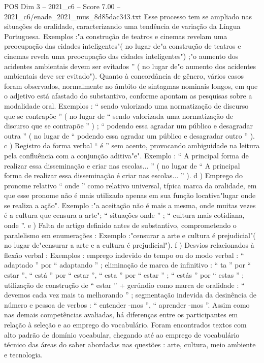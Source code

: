 \begin{textsample}{POS Dim 3 – 2021\_c6 – Score 7.00 – 2021\_c6/enade\_2021\_mus\_8d85dac343.txt}
Esse processo tem se ampliado nas situações de oralidade, caracterizando uma tendência de variação da Língua Portuguesa.
Exemplos :"a construção de teatros e cinemas revelam uma preocupação das cidades inteligentes"( no lugar de"a construção de teatros e cinemas revela uma preocupação das cidades inteligentes") ;"o aumento dos acidentes ambientais devem ser evitados ” ( no lugar de"o aumento dos acidentes ambientais deve ser evitado").
Quanto à concordância de gênero, vários casos foram observados, normalmente no âmbito de sintagmas nominais longos, em que o adjetivo está afastado do substantivo, conforme apontam as pesquisas sobre a modalidade oral.
Exemplos : “ sendo valorizado uma normatização de discurso que se contrapõe ” ( no lugar de “ sendo valorizada uma normatização de discurso que se contrapõe ” ) ; “ podendo essa agradar um público e desagradar outra ” ( no lugar de “ podendo essa agradar um público e desagradar outro ” ). c ) Registro da forma verbal “ é ” sem acento, provocando ambiguidade na leitura pela confluência com a conjunção aditiva"e".
Exemplo : “ A principal forma de realizar essa disseminação e criar nas escolas... ” ( no lugar de “ A principal forma de realizar essa disseminação é criar nas escolas... ” ). d ) Emprego do pronome relativo “ onde ” como relativo universal, típica marca da oralidade, em que esse pronome não é mais utilizado apenas em sua função locativa"lugar onde se realiza a ação".
Exemplo :"a aceitação não é mais a mesma, onde muitas vezes é a cultura que censura a arte"; “ situações onde ” ; “ cultura mais cotidiana, onde ”. e ) Falta de artigo definido antes de substantivo, comprometendo o paralelismo em enumerações : Exemplo :"censurar a arte e cultura é prejudicial"( no lugar de"censurar a arte e a cultura é prejudicial"). f ) Desvios relacionados à flexão verbal : Exemplos : emprego indevido do tempo ou do modo verbal : “ adaptado ” por “ adaptando ” ; eliminação de marca de infinitivo : “ ta ” por “ estar ”, “ está ” por “ estar ”, “ esta ” por “ estar ” ; “ estás ” por “ estas ” ; utilização de construção de “ estar ” + gerúndio como marca de oralidade : “ devemos cada vez mais ta melhorando ” ; segmentação indevida da desinência de número e pessoa de verbos : “ entender -mos ”, “ aprender -mos ”.
Assim como nas demais competências avaliadas, há diferenças entre os participantes em relação à seleção e ao emprego do vocabulário.
Foram encontrados textos com alto padrão de domínio vocabular, chegando até ao emprego de vocabulário técnico das áreas do saber abordadas nas questões : arte, cultura, meio ambiente e tecnologia.

\end{textsample}
